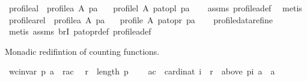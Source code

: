 \begin{isabellebody}
\isamarkupfalse%
%
\endisatagproof
{\isafoldproof}%
%
\isadelimproof
\isanewline
%
\endisadelimproof
\isanewline
{}\isamarkupfalse%
\ profile{\isacharunderscore}{\kern0pt}a{\isacharunderscore}{\kern0pt}l{\isacharcolon}{\kern0pt}\ \ {\isachardoublequoteopen}profile{\isacharunderscore}{\kern0pt}a\ A\ pa{\isachardoublequoteclose}\isanewline
\ \ \ {\isachardoublequoteopen}profile{\isacharunderscore}{\kern0pt}l\ A\ {\isacharparenleft}{\kern0pt}pa{\isacharunderscore}{\kern0pt}to{\isacharunderscore}{\kern0pt}pl\ pa{\isacharparenright}{\kern0pt}{\isachardoublequoteclose}\isanewline
%
\isadelimproof
\ \ %
\endisadelimproof
%
\isatagproof
{}\isamarkupfalse%
\ assms\ profile{\isacharunderscore}{\kern0pt}a{\isacharunderscore}{\kern0pt}def\ \isamarkupfalse%
\ {\isacharparenleft}{\kern0pt}metis{\isacharparenright}{\kern0pt}%
\endisatagproof
{\isafoldproof}%
%
\isadelimproof
\isanewline
%
\endisadelimproof
\isanewline
{}\isamarkupfalse%
\ profile{\isacharunderscore}{\kern0pt}a{\isacharunderscore}{\kern0pt}rel{\isacharcolon}{\kern0pt}\ \ {\isachardoublequoteopen}profile{\isacharunderscore}{\kern0pt}a\ A\ pa{\isachardoublequoteclose}\isanewline
\ \ \ {\isachardoublequoteopen}profile\ A\ {\isacharparenleft}{\kern0pt}pa{\isacharunderscore}{\kern0pt}to{\isacharunderscore}{\kern0pt}pr\ pa{\isacharparenright}{\kern0pt}{\isachardoublequoteclose}\isanewline
%
\isadelimproof
\ \ %
\endisadelimproof
%
\isatagproof
{}\isamarkupfalse%
\ profile{\isacharunderscore}{\kern0pt}data{\isacharunderscore}{\kern0pt}refine\isanewline
\ \ \isamarkupfalse%
\ {\isacharparenleft}{\kern0pt}metis\ assms\ brI\ pa{\isacharunderscore}{\kern0pt}to{\isacharunderscore}{\kern0pt}pr{\isacharunderscore}{\kern0pt}def\ profile{\isacharunderscore}{\kern0pt}a{\isacharunderscore}{\kern0pt}def{\isacharparenright}{\kern0pt}%
\endisatagproof
{\isafoldproof}%
%
\isadelimproof
%
\endisadelimproof
%
\begin{isamarkuptext}%
Monadic redifintion of counting functions.%
\end{isamarkuptext}\isamarkuptrue%
\isamarkupfalse%
\ {\isachardoublequoteopen}wc{\isacharunderscore}{\kern0pt}invar\ p{}\ a\ {\isasymequiv}\ {\isasymlambda}{\isacharparenleft}{\kern0pt}r{\isacharcomma}{\kern0pt}ac{\isacharparenright}{\kern0pt}{\isachardot}{\kern0pt}\isanewline
\ \ r\ {\isasymle}\ length\ p{}\ \isanewline
\ \ {\isasymand}\ ac\ {\isacharequal}{\kern0pt}\ card{\isacharbraceleft}{\kern0pt}i{\isacharcolon}{\kern0pt}{\isacharcolon}{\kern0pt}nat{\isachardot}{\kern0pt}\ i\ {\isacharless}{\kern0pt}\ r\ {\isasymand}\ above\ {\isacharparenleft}{\kern0pt}p{}{\isacharbang}{\kern0pt}i{\isacharparenright}{\kern0pt}\ a\ {\isacharequal}{\kern0pt}\ {\isacharbraceleft}{\kern0pt}a{\isacharbraceright}{\kern0pt}{\isacharbraceright}{\kern0pt}{\isachardoublequoteclose}\isanewline

\end{isabellebody}
